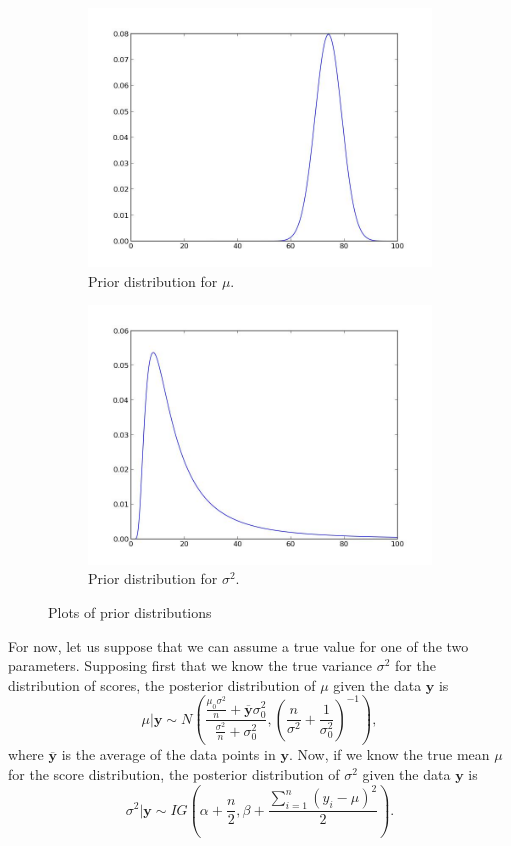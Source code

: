 \begin{figure}[h]
\centering
\begin{subfigure}[b]{.49\textwidth}
\includegraphics[width=\textwidth]{mean_prior.jpeg}
\caption{Prior distribution for $\mu$.}
\end{subfigure}
\begin{subfigure}[b]{.49\textwidth}
\includegraphics[width=\textwidth]{variance_prior.jpeg}
\caption{Prior distribution for $\sigma^{2}$.}
\end{subfigure}
\caption{Plots of prior distributions}
\end{figure}

For now, let us suppose that we can assume a true value for one of the two parameters. Supposing first that we know the true variance $\sigma^{2}$ for the distribution of scores, the posterior distribution of $\mu$ given the data $\mathbf{y}$ is
$$\mu | \mathbf{y} \sim N\left(\frac{\frac{\mu_{0}\sigma^{2}}{n} + \overline{\mathbf{y}}\sigma_{0}^{2}}{\frac{\sigma^{2}}{n} + \sigma_{0}^{2}}, \left(\frac{n}{\sigma^{2}} + \frac{1}{\sigma_{0}^{2}}\right)^{-1}\right),$$
where $\overline{\mathbf{y}}$ is the average of the data points in $\mathbf{y}$. Now, if we know the true mean $\mu$ for the score distribution, the posterior distribution of $\sigma^{2}$ given the data $\mathbf{y}$ is $$\sigma^{2} | \mathbf{y} \sim IG \left(\alpha + \frac{n}{2}, \beta + \frac{\sum_{i=1}^{n} (y_{i} - \mu)^{2}}{2}\right).$$


